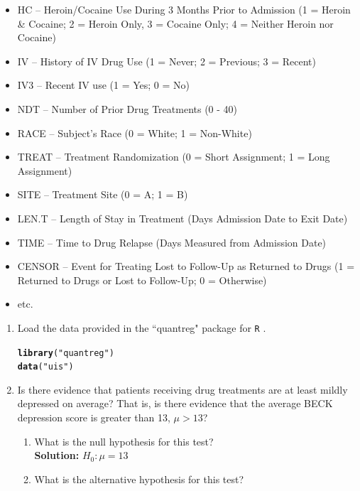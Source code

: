 \documentclass{article}\usepackage[]{graphicx}\usepackage[]{color}
\makeatletter
\newcommand{\hlstr}[1]{\textcolor[rgb]{0.192,0.494,0.8}{#1}}%
\newcommand{\hlstd}[1]{\textcolor[rgb]{0.345,0.345,0.345}{#1}}%
\newcommand{\hlkwd}[1]{\textcolor[rgb]{0.737,0.353,0.396}{\textbf{#1}}}%
\newenvironment{kframe}{%
 \def\at@end@of@kframe{}%
 \ifinner\ifhmode%
  \def\at@end@of@kframe{\end{minipage}}%
  \begin{minipage}{\columnwidth}%
 \fi\fi%
 \def\FrameCommand##1{\hskip\@totalleftmargin \hskip-\fboxsep
 \colorbox{shadecolor}{##1}\hskip-\fboxsep
     \hskip-\linewidth \hskip-\@totalleftmargin \hskip\columnwidth}%
 \MakeFramed {\advance\hsize-\width
   \@totalleftmargin\z@ \linewidth\hsize
   \@setminipage}}%
 {\par\unskip\endMakeFramed%
 \at@end@of@kframe}
\newenvironment{knitrout}{}{} %
\makeatother
\begin{document}
\begin{enumerate}
\begin{itemize}
    \item HC --	Heroin/Cocaine Use During	3 Months Prior to Admission (1 = Heroin
    \& Cocaine; 2 = Heroin Only, 3 = Cocaine Only; 4 = Neither Heroin nor Cocaine)
    \item IV -- History of IV Drug Use	(1 = Never; 2 = Previous; 3 = Recent)
    \item IV3	-- Recent IV use	(1 = Yes; 0 = No)
    \item NDT -- Number of Prior Drug Treatments (0 - 40)
    \item RACE -- Subject's Race	(0 = White; 1 = Non-White)
\item TREAT -- Treatment Randomization (0 = Short Assignment;	1 = Long Assignment)
\item SITE -- Treatment Site (0 = A; 1 = B)
\item LEN.T	-- Length of Stay in Treatment (Days Admission Date to Exit Date)	
\item TIME -- Time to Drug Relapse (Days Measured from Admission Date)
\item CENSOR -- Event for Treating Lost to Follow-Up as Returned to Drugs 
(1 = Returned to Drugs or Lost to Follow-Up; 0 = Otherwise)
\item etc.
\end{itemize}
\begin{enumerate} %
\item Load the data provided in the ``quantreg" package for \texttt{R} \citep{quantreg}.
\begin{knitrout}
\color{fgcolor}\begin{kframe}
\begin{alltt}
\hlkwd{library}\hlstd{(}\hlstr{"quantreg"}\hlstd{)}
\hlkwd{data}\hlstd{(}\hlstr{"uis"}\hlstd{)}
\end{alltt}
\end{kframe}
\end{knitrout}
\item Is there evidence that patients receiving drug treatments are at least mildly depressed
on average? That is, is there evidence that the average BECK depression score is greater
than 13, $\mu>13$?
    \begin{enumerate}
      \item What is the null hypothesis for this test?\\
      \textbf{Solution:} $H_{0}: \mu=13$
      \item What is the alternative hypothesis for this test?\\

\end{enumerate}
\end{enumerate}
\end{enumerate}
\end{document}
